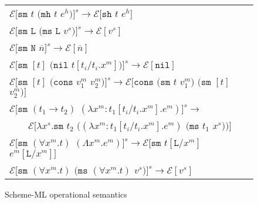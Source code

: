 \begin{figure}[p]
\centering
\begin{tabular}{l}

$\mathscr{E}[\mathtt{sm}$ $t$ $(\mathtt{mh}$ $t$ $e^h)]^s\rightarrow\mathscr{E}[\mathtt{sh}$ $t$ $e^h]$ \\

$\mathscr{E}[\mathtt{sm}$ $\mathtt{L}$ $(\mathtt{ms}$ $\mathtt{L}$ $v^s)]^s\rightarrow\mathscr{E}[v^s]$ \\

$\mathscr{E}[\mathtt{sm}$ $\mathtt{N}$ $\overline{n}]^s\rightarrow\mathscr{E}[\overline{n}]$ \\

$\mathscr{E}[\mathtt{sm}$ $[t]$ $(\mathtt{nil}$ $t[t_i/t_i.x^m])]^s\rightarrow\mathscr{E}[\mathtt{nil}]$ \\

$\mathscr{E}[\mathtt{sm}$ $[t]$ $(\mathtt{cons}$ $v^m_1$ $v^m_2)]^s\rightarrow\mathscr{E}[\mathtt{cons}$ $(\mathtt{sm}$ $t$ $v^m_1)$ $(\mathtt{sm}$ $[t]$ $v^m_2)]$ \\

$\mathscr{E}[\mathtt{sm}$ $(t_1\rightarrow t_2)$ $(\lambda x^m:t_1[t_i/t_i.x^m].e^m)]^s\rightarrow$ \\

$\quad\quad\mathscr{E}[\lambda x^s.\mathtt{sm}$ $t_2$ $((\lambda x^m:t_1[t_i/t_i.x^m].e^m)$ $(\mathtt{ms}$ $t_1$ $x^s))]$ \\

$\mathscr{E}[\mathtt{sm}$ $(\forall x^m.t)$ $(\Lambda x^m.e^m)]^s\rightarrow\mathscr{E}[\mathtt{sm}$ $t[\mathtt{L}/x^m]$ $e^m[\mathtt{L}/x^m]]$ \\

$\mathscr{E}[\mathtt{sm}$ $(\forall x^m.t)$ $(\mathtt{ms}$ $(\forall x^m.t)$ $v^s)]^s\rightarrow\mathscr{E}[v^s]$

\end{tabular}
\caption{Scheme-ML operational semantics}
\label{smos}
\end{figure}